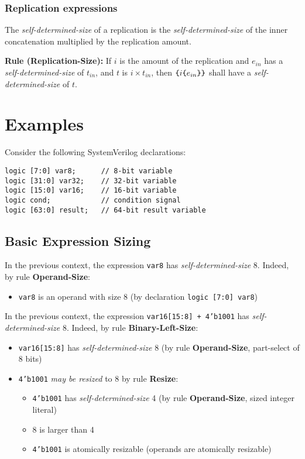 \documentclass{article}
\newcommand{\sv}[1]{\texttt{#1}}
\newcommand{\sds}{\emph{self-determined-size}}
\newcommand{\mbr}{\emph{may be resized}}
\newenvironment{typingrule}[1]%
{\par\noindent\textbf{Rule (#1):} }%
{\par}
\begin{document}
\subsubsection{Replication expressions}%
\label{replication-expressions}

The \sds{} of a replication is the
\sds{} of the inner concatenation multiplied by the
replication amount.

\begin{typingrule}{Replication-Size}
  If $i$ is the amount of the replication and $e_{in}$ has a
  \sds{} of $t_{in}$, and $t$ is $i \times t_{in}$, then
  $\verb|{| i \verb|{| e_{in}\verb|}}|$ shall have a
  \sds{} of $t$.
\end{typingrule}

\section{Examples}

Consider the following SystemVerilog declarations:

\begin{verbatim}
logic [7:0] var8;      // 8-bit variable
logic [31:0] var32;    // 32-bit variable
logic [15:0] var16;    // 16-bit variable
logic cond;            // condition signal
logic [63:0] result;   // 64-bit result variable
\end{verbatim}

\subsection{Basic Expression Sizing}

In the previous context, the expression \sv{var8} has
\sds{} 8. Indeed, by rule \textbf{Operand-Size}:
\begin{itemize}
  \item \sv{var8} is an operand with size 8 (by declaration
    \sv{logic [7:0] var8})
\end{itemize}

In the previous context, the expression \sv{var16[15:8] + 4'b1001} has
\sds{} 8. Indeed, by rule \textbf{Binary-Left-Size}:

\begin{itemize}
  \item \sv{var16[15:8]} has \sds{} 8 (by rule
    \textbf{Operand-Size}, part-select of 8 bits)
  \item \sv{4'b1001} \mbr{} to 8 by rule \textbf{Resize}:
    \begin{itemize}
      \item \sv{4'b1001} has \sds{} 4 (by rule
        \textbf{Operand-Size}, sized integer literal)
      \item 8 is larger than 4
      \item \sv{4'b1001} is atomically resizable (operands are
        atomically resizable)
    \end{itemize}
\end{itemize}
\end{document}
